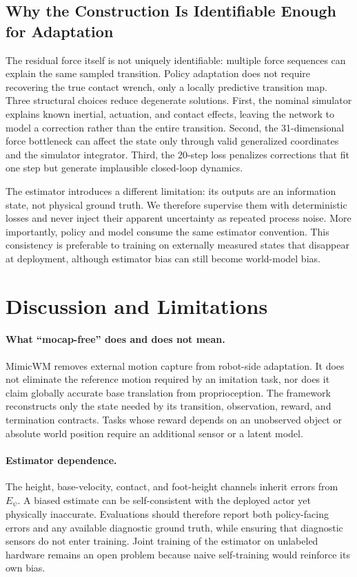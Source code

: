 \documentclass[10pt,twocolumn]{article}
\newcommand{\method}{MimicWM}
\begin{document}
\subsection{Why the Construction Is Identifiable Enough for Adaptation}
\label{sec:analysis}

The residual force itself is not uniquely identifiable: multiple force sequences can explain the same sampled transition. Policy adaptation does not require recovering the true contact wrench, only a locally predictive transition map. Three structural choices reduce degenerate solutions. First, the nominal simulator explains known inertial, actuation, and contact effects, leaving the network to model a correction rather than the entire transition. Second, the 31-dimensional force bottleneck can affect the state only through valid generalized coordinates and the simulator integrator. Third, the 20-step loss penalizes corrections that fit one step but generate implausible closed-loop dynamics.

The estimator introduces a different limitation: its outputs are an information state, not physical ground truth. We therefore supervise them with deterministic losses and never inject their apparent uncertainty as repeated process noise. More importantly, policy and model consume the same estimator convention. This consistency is preferable to training on externally measured states that disappear at deployment, although estimator bias can still become world-model bias.

\section{Discussion and Limitations}
\label{sec:discussion}

\paragraph{What ``mocap-free'' does and does not mean.}
\method{} removes external motion capture from robot-side adaptation. It does not eliminate the reference motion required by an imitation task, nor does it claim globally accurate base translation from proprioception. The framework reconstructs only the state needed by its transition, observation, reward, and termination contracts. Tasks whose reward depends on an unobserved object or absolute world position require an additional sensor or a latent model.

\paragraph{Estimator dependence.}
The height, base-velocity, contact, and foot-height channels inherit errors from $E_\psi$. A biased estimate can be self-consistent with the deployed actor yet physically inaccurate. Evaluations should therefore report both policy-facing errors and any available diagnostic ground truth, while ensuring that diagnostic sensors do not enter training. Joint training of the estimator on unlabeled hardware remains an open problem because naive self-training would reinforce its own bias.
\end{document}
